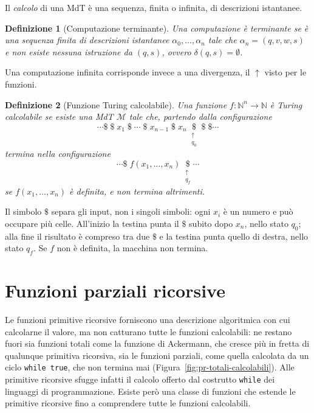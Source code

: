 \documentclass[a4paper, 11pt, oneside]{book}
\theoremstyle{formale}
\newtheorem*{definition}{Definizione}
\begin{document}
    Il \emph{calcolo} di una MdT \`e una sequenza, finita o infinita, di descrizioni
    istantanee.

    \begin{definition}[Computazione terminante]
        Una computazione \`e \emph{terminante} se \`e una sequenza finita di descrizioni
        istantanee $\alpha_0, \dots, \alpha_n$ tale che $\alpha_n = (q, v, w, s)$ e non
        esiste nessuna istruzione da $(q, s)$, ovvero $\delta(q, s) = \emptyset$.
    \end{definition}

    Una computazione infinita corrisponde invece a una divergenza, il ${\uparrow}$ visto
    per le funzioni.

    \begin{definition}[Funzione Turing calcolabile]
        Una funzione $f \colon \mathbb{N}^n \to \mathbb{N}$ \`e \emph{Turing calcolabile}
        se esiste una MdT $\mathcal{M}$ tale che, partendo dalla configurazione
        \begin{equation*}
            \cdots \$ \; \$ \; x_1 \; \$ \; \cdots \; \$ \; x_{n-1} \; \$ \; x_n \;
            \underset{\substack{\uparrow \\ q_0}}{\$} \; \$ \; \$ \cdots
        \end{equation*}
        termina nella configurazione
        \begin{equation*}
            \cdots \$ \; f(x_1, \dots, x_n) \;
            \underset{\substack{\uparrow \\ q_f}}{\$} \cdots
        \end{equation*}
        se $f(x_1, \dots, x_n)$ \`e definita, e non termina altrimenti.
    \end{definition}

    Il simbolo $\$$ separa gli input, non i singoli simboli: ogni $x_i$ \`e un numero e
    pu\`o occupare pi\`u celle. All'inizio la testina punta il $\$$ subito dopo $x_n$,
    nello stato $q_0$; alla fine il risultato \`e compreso tra due $\$$ e la testina
    punta quello di destra, nello stato $q_f$. Se $f$ non \`e definita, la macchina non
    termina.

    \section{Funzioni parziali ricorsive}
    \label{sec:parziali-ricorsive}
    Le funzioni primitive ricorsive forniscono una descrizione algoritmica con cui
    calcolarne il valore, ma non catturano tutte le funzioni calcolabili: ne restano
    fuori sia funzioni totali come la funzione di Ackermann, che cresce pi\`u in fretta
    di qualunque primitiva ricorsiva, sia le funzioni parziali, come quella calcolata da
    un ciclo \texttt{while true}, che non termina mai
    (Figura~\ref{fig:pr-totali-calcolabili}). Alle primitive ricorsive sfugge infatti il
    calcolo offerto dal costrutto \texttt{while} dei linguaggi di programmazione. Esiste
    per\`o una classe di funzioni che estende le primitive ricorsive fino a comprendere
    tutte le funzioni calcolabili.
\end{document}
